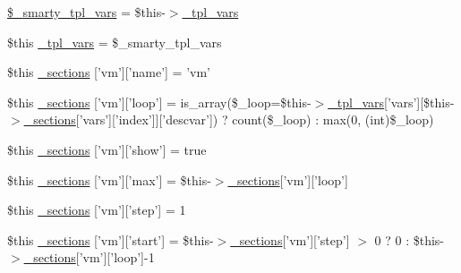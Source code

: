 \begin{DoxyCompactItemize}
\item 
\hyperlink{34d6fa4bfd5eef6424a9ddc74a166350_2_06_06708_05_06_06708843835_05var_8tpl_8php_a14dde6d029d65a879ee7bc1ebc398dd1}{\$\-\_\-smarty\-\_\-tpl\-\_\-vars} = \$this-\/$>$\hyperlink{_06_06127_05_06_0612781687_05pkgelementindex_8tpl_8php_a4a4846d8e68d455590131a05697f67a3}{\-\_\-tpl\-\_\-vars}
\item 
\$this \hyperlink{34d6fa4bfd5eef6424a9ddc74a166350_2_06_06708_05_06_06708843835_05var_8tpl_8php_a4a4846d8e68d455590131a05697f67a3}{\-\_\-tpl\-\_\-vars} = \$\-\_\-smarty\-\_\-tpl\-\_\-vars
\item 
\$this \hyperlink{34d6fa4bfd5eef6424a9ddc74a166350_2_06_06708_05_06_06708843835_05var_8tpl_8php_a8815c04e0d3e2e64606b802ae35eab02}{\-\_\-sections} \mbox{[}'vm'\mbox{]}\mbox{[}'name'\mbox{]} = 'vm'
\item 
\$this \hyperlink{34d6fa4bfd5eef6424a9ddc74a166350_2_06_06708_05_06_06708843835_05var_8tpl_8php_a48faf75de18919893be4beb34ff8962c}{\-\_\-sections} \mbox{[}'vm'\mbox{]}\mbox{[}'loop'\mbox{]} = is\-\_\-array(\$\-\_\-loop=\$this-\/$>$\hyperlink{_06_06127_05_06_0612781687_05pkgelementindex_8tpl_8php_a4a4846d8e68d455590131a05697f67a3}{\-\_\-tpl\-\_\-vars}\mbox{[}'vars'\mbox{]}\mbox{[}\$this-\/$>$\hyperlink{_06_06127_05_06_0612781687_05pkgelementindex_8tpl_8php_a9e3d26b39edfe29c3f29b8035ef33828}{\-\_\-sections}\mbox{[}'vars'\mbox{]}\mbox{[}'index'\mbox{]}\mbox{]}\mbox{[}'descvar'\mbox{]}) ? count(\$\-\_\-loop) \-: max(0, (int)\$\-\_\-loop)
\item 
\$this \hyperlink{34d6fa4bfd5eef6424a9ddc74a166350_2_06_06708_05_06_06708843835_05var_8tpl_8php_a0c0e56e7807182d378d09ef0cdeee34e}{\-\_\-sections} \mbox{[}'vm'\mbox{]}\mbox{[}'show'\mbox{]} = true
\item 
\$this \hyperlink{34d6fa4bfd5eef6424a9ddc74a166350_2_06_06708_05_06_06708843835_05var_8tpl_8php_ae52a39cb292b0d649e41d15106638480}{\-\_\-sections} \mbox{[}'vm'\mbox{]}\mbox{[}'max'\mbox{]} = \$this-\/$>$\hyperlink{_06_06127_05_06_0612781687_05pkgelementindex_8tpl_8php_a9e3d26b39edfe29c3f29b8035ef33828}{\-\_\-sections}\mbox{[}'vm'\mbox{]}\mbox{[}'loop'\mbox{]}
\item 
\$this \hyperlink{34d6fa4bfd5eef6424a9ddc74a166350_2_06_06708_05_06_06708843835_05var_8tpl_8php_a4c1a69cc7a45a7169d0b1e8b5f96e635}{\-\_\-sections} \mbox{[}'vm'\mbox{]}\mbox{[}'step'\mbox{]} = 1
\item 
\$this \hyperlink{34d6fa4bfd5eef6424a9ddc74a166350_2_06_06708_05_06_06708843835_05var_8tpl_8php_ae6affea3286026e39a2e18ee6ab65976}{\-\_\-sections} \mbox{[}'vm'\mbox{]}\mbox{[}'start'\mbox{]} = \$this-\/$>$\hyperlink{_06_06127_05_06_0612781687_05pkgelementindex_8tpl_8php_a9e3d26b39edfe29c3f29b8035ef33828}{\-\_\-sections}\mbox{[}'vm'\mbox{]}\mbox{[}'step'\mbox{]} $>$ 0 ? 0 \-: \$this-\/$>$\hyperlink{_06_06127_05_06_0612781687_05pkgelementindex_8tpl_8php_a9e3d26b39edfe29c3f29b8035ef33828}{\-\_\-sections}\mbox{[}'vm'\mbox{]}\mbox{[}'loop'\mbox{]}-\/1

\end{DoxyCompactItemize}
